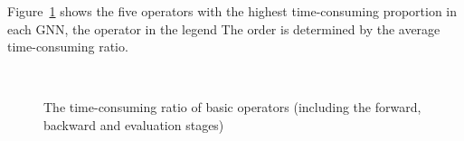 Figure~\ref{fig:exp_top_basic_ops} shows the five operators with the highest time-consuming proportion in each GNN, 
the operator in the legend The order is determined by the average time-consuming ratio.

\begin{figure}
	\centering
    \\
    \caption{The time-consuming ratio of basic operators (including the forward, backward and evaluation stages)}
	\label{fig:exp_top_basic_ops}
\end{figure}

